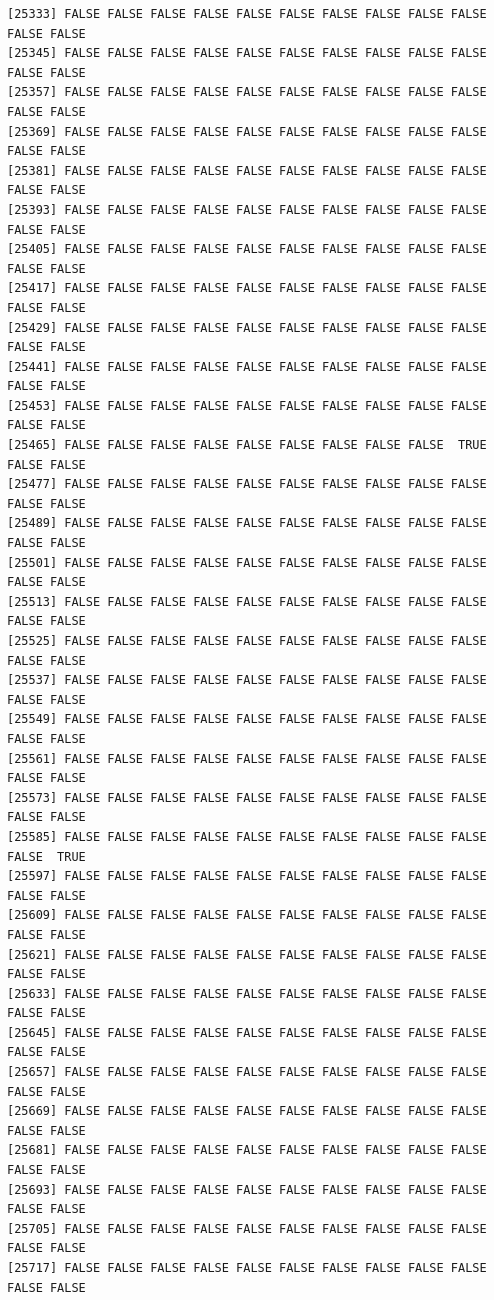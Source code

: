 \documentclass[
  a4paper,
  DIV=11,
  numbers=noendperiod]{scrartcl}
\begin{document}
\begin{verbatim}
[25333] FALSE FALSE FALSE FALSE FALSE FALSE FALSE FALSE FALSE FALSE FALSE FALSE
[25345] FALSE FALSE FALSE FALSE FALSE FALSE FALSE FALSE FALSE FALSE FALSE FALSE
[25357] FALSE FALSE FALSE FALSE FALSE FALSE FALSE FALSE FALSE FALSE FALSE FALSE
[25369] FALSE FALSE FALSE FALSE FALSE FALSE FALSE FALSE FALSE FALSE FALSE FALSE
[25381] FALSE FALSE FALSE FALSE FALSE FALSE FALSE FALSE FALSE FALSE FALSE FALSE
[25393] FALSE FALSE FALSE FALSE FALSE FALSE FALSE FALSE FALSE FALSE FALSE FALSE
[25405] FALSE FALSE FALSE FALSE FALSE FALSE FALSE FALSE FALSE FALSE FALSE FALSE
[25417] FALSE FALSE FALSE FALSE FALSE FALSE FALSE FALSE FALSE FALSE FALSE FALSE
[25429] FALSE FALSE FALSE FALSE FALSE FALSE FALSE FALSE FALSE FALSE FALSE FALSE
[25441] FALSE FALSE FALSE FALSE FALSE FALSE FALSE FALSE FALSE FALSE FALSE FALSE
[25453] FALSE FALSE FALSE FALSE FALSE FALSE FALSE FALSE FALSE FALSE FALSE FALSE
[25465] FALSE FALSE FALSE FALSE FALSE FALSE FALSE FALSE FALSE  TRUE FALSE FALSE
[25477] FALSE FALSE FALSE FALSE FALSE FALSE FALSE FALSE FALSE FALSE FALSE FALSE
[25489] FALSE FALSE FALSE FALSE FALSE FALSE FALSE FALSE FALSE FALSE FALSE FALSE
[25501] FALSE FALSE FALSE FALSE FALSE FALSE FALSE FALSE FALSE FALSE FALSE FALSE
[25513] FALSE FALSE FALSE FALSE FALSE FALSE FALSE FALSE FALSE FALSE FALSE FALSE
[25525] FALSE FALSE FALSE FALSE FALSE FALSE FALSE FALSE FALSE FALSE FALSE FALSE
[25537] FALSE FALSE FALSE FALSE FALSE FALSE FALSE FALSE FALSE FALSE FALSE FALSE
[25549] FALSE FALSE FALSE FALSE FALSE FALSE FALSE FALSE FALSE FALSE FALSE FALSE
[25561] FALSE FALSE FALSE FALSE FALSE FALSE FALSE FALSE FALSE FALSE FALSE FALSE
[25573] FALSE FALSE FALSE FALSE FALSE FALSE FALSE FALSE FALSE FALSE FALSE FALSE
[25585] FALSE FALSE FALSE FALSE FALSE FALSE FALSE FALSE FALSE FALSE FALSE  TRUE
[25597] FALSE FALSE FALSE FALSE FALSE FALSE FALSE FALSE FALSE FALSE FALSE FALSE
[25609] FALSE FALSE FALSE FALSE FALSE FALSE FALSE FALSE FALSE FALSE FALSE FALSE
[25621] FALSE FALSE FALSE FALSE FALSE FALSE FALSE FALSE FALSE FALSE FALSE FALSE
[25633] FALSE FALSE FALSE FALSE FALSE FALSE FALSE FALSE FALSE FALSE FALSE FALSE
[25645] FALSE FALSE FALSE FALSE FALSE FALSE FALSE FALSE FALSE FALSE FALSE FALSE
[25657] FALSE FALSE FALSE FALSE FALSE FALSE FALSE FALSE FALSE FALSE FALSE FALSE
[25669] FALSE FALSE FALSE FALSE FALSE FALSE FALSE FALSE FALSE FALSE FALSE FALSE
[25681] FALSE FALSE FALSE FALSE FALSE FALSE FALSE FALSE FALSE FALSE FALSE FALSE
[25693] FALSE FALSE FALSE FALSE FALSE FALSE FALSE FALSE FALSE FALSE FALSE FALSE
[25705] FALSE FALSE FALSE FALSE FALSE FALSE FALSE FALSE FALSE FALSE FALSE FALSE
[25717] FALSE FALSE FALSE FALSE FALSE FALSE FALSE FALSE FALSE FALSE FALSE FALSE

\end{verbatim}
\end{document}
